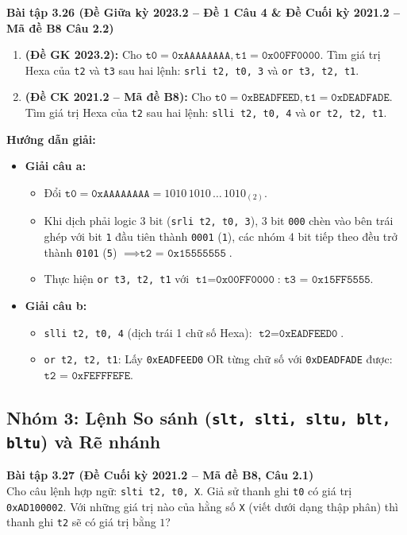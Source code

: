 \textbf{Bài tập 3.26 (Đề Giữa kỳ 2023.2 -- Đề 1 Câu 4 \& Đề Cuối kỳ 2021.2 -- Mã đề B8 Câu 2.2)}
\begin{enumerate}[label=\alph*)]
    \item \textbf{(Đề GK 2023.2):} Cho $\texttt{t0} = \texttt{0xAAAAAAAA}, \texttt{t1} = \texttt{0x00FF0000}$. Tìm giá trị Hexa của \texttt{t2} và \texttt{t3} sau hai lệnh: \texttt{srli t2, t0, 3} và \texttt{or t3, t2, t1}.
    \item \textbf{(Đề CK 2021.2 -- Mã đề B8):} Cho $\texttt{t0} = \texttt{0xBEADFEED}, \texttt{t1} = \texttt{0xDEADFADE}$. Tìm giá trị Hexa của \texttt{t2} sau hai lệnh: \texttt{slli t2, t0, 4} và \texttt{or t2, t2, t1}.
\end{enumerate}
\textbf{Hướng dẫn giải:}
\begin{itemize}
    \item \textbf{Giải câu a:}
    \begin{itemize}
        \item Đổi $\texttt{t0} = \texttt{0xAAAAAAAA} = 1010\,1010\,\dots\,1010_{(2)}$.
        \item Khi dịch phải logic $3\text{ bit}$ (\texttt{srli t2, t0, 3}), 3 bit \texttt{000} chèn vào bên trái ghép với bit \texttt{1} đầu tiên thành \texttt{0001} (\texttt{1}), các nhóm 4 bit tiếp theo đều trở thành \texttt{0101} (\texttt{5}) $\implies \mathbf{\texttt{t2 = 0x15555555}}$.
        \item Thực hiện \texttt{or t3, t2, t1} với $\texttt{t1} = \texttt{0x00FF0000}$: $\mathbf{\texttt{t3 = 0x15FF5555}}$.
    \end{itemize}
    \item \textbf{Giải câu b:}
    \begin{itemize}
        \item \texttt{slli t2, t0, 4} (dịch trái 1 chữ số Hexa): $\texttt{t2} = \texttt{0xEADFEED0}$.
        \item \texttt{or t2, t2, t1}: Lấy \texttt{0xEADFEED0} OR từng chữ số với \texttt{0xDEADFADE} được: $\mathbf{\texttt{t2 = 0xFEFFFEFE}}$.
    \end{itemize}
\end{itemize}

\subsection{Nhóm 3: Lệnh So sánh (\texttt{slt, slti, sltu, blt, bltu}) và Rẽ nhánh}

\textbf{Bài tập 3.27 (Đề Cuối kỳ 2021.2 -- Mã đề B8, Câu 2.1)}\\
Cho câu lệnh hợp ngữ: \texttt{slti t2, t0, X}. Giả sử thanh ghi \texttt{t0} có giá trị \texttt{0xAD100002}. Với những giá trị nào của hằng số \texttt{X} (viết dưới dạng thập phân) thì thanh ghi \texttt{t2} sẽ có giá trị bằng $1$?

